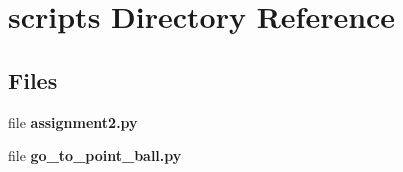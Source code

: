 \section{scripts Directory Reference}
\label{dir_53e6fa9553ac22a5646d2a2b2d7b97a1}
\subsection*{Files}
\begin{DoxyCompactItemize}
\item 
file \textbf{ assignment2.\+py}
\item 
file \textbf{ go\+\_\+to\+\_\+point\+\_\+ball.\+py}
\end{DoxyCompactItemize}
